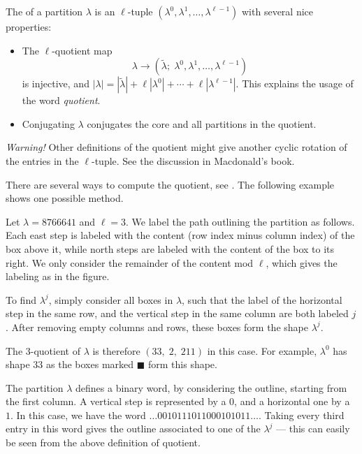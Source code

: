 The  of a partition $\lambda$
is an $\ell$-tuple $(\lambda^0,\lambda^1,\dotsc,\lambda^{\ell-1})$
with several nice properties: 
\begin{itemize}
\item The $\ell$-quotient map
\[
\lambda \to \left( \widetilde{\lambda}; \; \lambda^0,\lambda^1,\dotsc,\lambda^{\ell-1} \right)
\]
is injective, and $|\lambda|  = |\widetilde{\lambda}| + \ell |\lambda^0| + \dotsb  + \ell |\lambda^{\ell-1}|$.
This explains the usage of the word \emph{quotient}.
\item 
Conjugating $\lambda$ conjugates the core and all partitions in the quotient.
\end{itemize}

\emph{Warning!} 
Other definitions of the quotient might give another cyclic rotation of the entries in the $\ell$-tuple.
See the discussion in Macdonald's book.

There are several ways to compute the quotient, see \cite[p.12]{Macdonald1995}.
The following example shows one possible method.

\begin{example}
Let $\lambda = 8766641$ and $\ell=3$. We label the path outlining the partition
as follows. Each east step is labeled with the content (row index minus column index)
of the box above it, while north steps are labeled with the content of the box to its right.
We only consider the remainder of the content mod $\ell$, which gives the labeling as in the figure.

To find $\lambda^j$, simply consider all boxes in $\lambda$, such that the label of the horizontal step in the same row,
and the vertical step in the same column are both labeled $j$.
After removing empty columns and rows, these boxes form the shape $\lambda^j$.
\begin{figure}

\ytableaushort{{\;}{\;}{\;},{\;}{\;}{\;}}
\ytableaushort{{\;}{\;}}
\ytableaushort{{\;}{\;},{\;},{\;}}
\end{figure}

The $3$-quotient of $\lambda$ is therefore $(33,\;2,\; 211)$ in this case.
For example, $\lambda^0$ has shape $33$ as the boxes marked $\blacksquare$ form this shape.

The partition $\lambda$ defines a binary word, by considering the outline,
starting from the first column. A vertical step is represented by a 0, and a horizontal one by a $1$.
In this case, we have the word $\dotsc0010111011000101011\dotsc$.
Taking every third entry in this word gives the outline associated to one of the $\lambda^j$ ---
this can easily be seen from the above definition of quotient.
\end{example}


